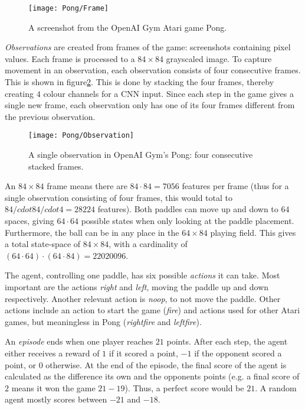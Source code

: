 \begin{figure}[h]
    \centering
    \texttt{[image: Pong/Frame]}
    \caption{A screenshot from the OpenAI Gym Atari game Pong.}
    \label{fig:pong-screen}
\end{figure}

\emph{Observations} are created from frames of the game: screenshots containing pixel values. Each frame is processed to a $84 \times 84$ grayscaled image. To capture movement in an observation, each observation consists of four consecutive frames. This is shown in figure\ref{fig:pong-obs}. This is done by stacking the four frames, thereby creating $4$ colour channels for a CNN input. Since each step in the game gives a single new frame, each observation only has one of its four frames different from the previous observation.

\begin{figure}[h]
    \centering
    \texttt{[image: Pong/Observation]}
    \caption{A single observation in OpenAI Gym's Pong: four consecutive stacked frames.}
    \label{fig:pong-obs}
\end{figure}

An $84 \times 84$ frame means there are $ 84 \cdot 84 = 7056$ features per frame (thus for a single observation consisting of four frames, this would total to $84 /cdot 84 /cdot 4 = 28224$ features). Both paddles can move up and down to $64$ spaces, giving $64 \cdot 64$ possible states when only looking at the paddle placement. Furthermore, the ball can be in any place in the $64 \times 84$ playing field. This gives a total state-space of $84 \times 84$, with a cardinality of $(64 \cdot 64) \cdot (64 \cdot 84) = 22020096$. 

The agent, controlling one paddle, has six possible \emph{actions} it can take. Most important are the actions \textit{right} and \textit{left}, moving the paddle up and down respectively. Another relevant action is \textit{noop}, to not move the paddle. Other actions include an action to start the game (\textit{fire}) and actions used for other Atari games, but meaningless in Pong (\textit{rightfire} and \textit{leftfire}). 

An \emph{episode} ends when one player reaches $21$ points. After each step, the agent either receives a reward of $1$ if it scored a point, $-1$ if the opponent scored a point, or $0$ otherwise. At the end of the episode, the final score of the agent is calculated as the difference its own and the opponents points (e.g. a final score of $2$ means it won the game $21 - 19$). Thus, a perfect score would be $21$. A random agent mostly scores between $-21$ and $-18$.

